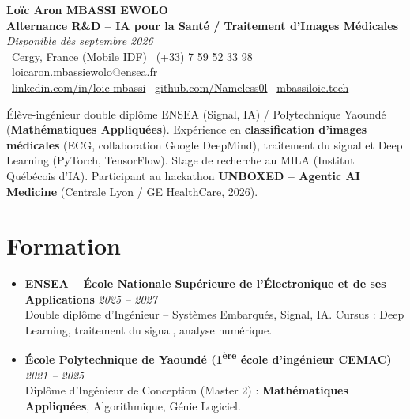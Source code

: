 \documentclass[a4paper,11pt]{article}
\begin{document}
\begin{center}
    {\Large \textbf{Loïc Aron MBASSI EWOLO}} \\ \vspace{4pt}
    \textbf{\large Alternance R\&D -- IA pour la Santé / Traitement d'Images Médicales} \\
    \textit{\small Disponible dès septembre 2026} \\ \vspace{4pt}
    \small
    \faMapMarker\ Cergy, France (Mobile IDF) \quad
    \faPhone\ (+33) 7 59 52 33 98 \quad
    \faEnvelope\ \href{mailto:loicaron.mbassiewolo@ensea.fr}{loicaron.mbassiewolo@ensea.fr} \\ \vspace{2pt}
    \faLinkedin\ \href{https://www.linkedin.com/in/loic-mbassi/}{linkedin.com/in/loic-mbassi} \quad
    \faGithub\ \href{https://github.com/Nameless0l}{github.com/Nameless0l} \quad
    \faGlobe\ \href{https://mbassiloic.tech}{mbassiloic.tech}
\end{center}

\vspace{-6pt}

\noindent\small{Élève-ingénieur double diplôme ENSEA (Signal, IA) / Polytechnique Yaoundé (\textbf{Mathématiques Appliquées}). Expérience en \textbf{classification d'images médicales} (ECG, collaboration Google DeepMind), traitement du signal et Deep Learning (PyTorch, TensorFlow). Stage de recherche au MILA (Institut Québécois d'IA). Participant au hackathon \textbf{UNBOXED -- Agentic AI Medicine} (Centrale Lyon / GE HealthCare, 2026).}

\section{Formation}
\begin{itemize}[leftmargin=*, label=\tiny$\bullet$, nosep]
    \item \textbf{ENSEA -- École Nationale Supérieure de l'Électronique et de ses Applications} \hfill \textit{2025 -- 2027} \\
    \small{Double diplôme d'Ingénieur -- Systèmes Embarqués, Signal, IA. Cursus : Deep Learning, traitement du signal, analyse numérique.}
    \item \textbf{École Polytechnique de Yaoundé (1\textsuperscript{ère} école d'ingénieur CEMAC)} \hfill \textit{2021 -- 2025} \\
    \small{Diplôme d'Ingénieur de Conception (Master 2) : \textbf{Mathématiques Appliquées}, Algorithmique, Génie Logiciel.}
\end{itemize}
\end{document}
